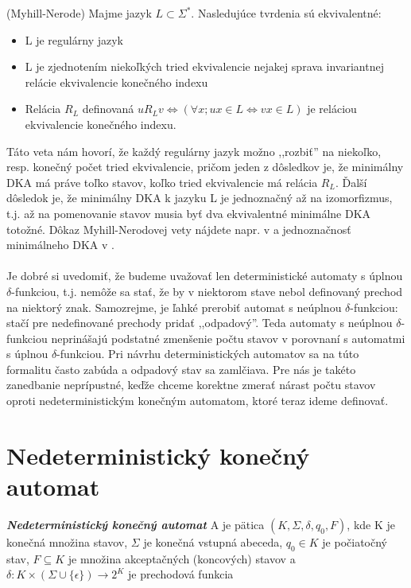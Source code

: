 \label{myhillNerode}
\begin{thm}(Myhill-Nerode) Majme jazyk $L \subset \Sigma^*$. Nasledujúce tvrdenia sú ekvivalentné:
\begin{itemize}
  \item L je regulárny jazyk
  \item L je zjednotením niekoľkých tried ekvivalencie nejakej sprava invariantnej relácie ekvivalencie konečného indexu
  \item Relácia $R_L$ definovaná $uR_Lv \Longleftrightarrow (\forall x;ux \in L \Longleftrightarrow vx \in L)$ je reláciou ekvivalencie konečného indexu.
\end{itemize}
\end{thm}

Táto veta nám hovorí, že každý regulárny jazyk možno ,,rozbiť'' na niekoľko, resp. konečný počet tried ekvivalencie, pričom jeden z dôsledkov je, že minimálny DKA má práve toľko stavov, koľko tried ekvivalencie má relácia $R_L$. Ďalší dôsledok je, že minimálny DKA k jazyku L je jednoznačný až na izomorfizmus, t.j. až na pomenovanie stavov musia byť dva ekvivalentné minimálne DKA totožné. Dôkaz Myhill-Nerodovej vety nájdete napr. v \cite[Veta 2.9.1]{skripta} a jednoznačnosť minimálneho DKA v \cite[Veta 4.26]{hopcroft}.

\paragraph{}
Je dobré si uvedomiť, že budeme uvažovať len deterministické automaty s úplnou $\delta$-funkciou, t.j. nemôže sa stať, že by v niektorom stave nebol definovaný prechod na niektorý znak. Samozrejme, je ľahké prerobiť automat s neúplnou $\delta$-funkciou: stačí pre nedefinované prechody pridať ,,odpadový''. Teda automaty s neúplnou $\delta$-funkciou neprinášajú podstatné zmenšenie počtu stavov v porovnaní s automatmi s úplnou $\delta$-funkciou. Pri návrhu deterministických automatov sa na túto formalitu často zabúda a odpadový stav sa zamlčiava. Pre nás je takéto zanedbanie neprípustné, keďže chceme korektne zmerať nárast počtu stavov oproti nedeterministickým konečným automatom, ktoré teraz ideme definovať.

\section{Nedeterministický konečný automat}

\begin{defn}{\textbf {\textit {Nedeterministický konečný automat}}} A je pätica $(K,\Sigma,\delta,q_0,F)$, kde K je
konečná množina stavov, $\Sigma$ je konečná vstupná abeceda, $q_0 \in K$ je počiatočný stav, $F \subseteq K$ je množina akceptačných (koncových) stavov a $\delta: K \times (\Sigma \cup \{\epsilon\}) \rightarrow 2^{K}$ je prechodová funkcia \end{defn}

